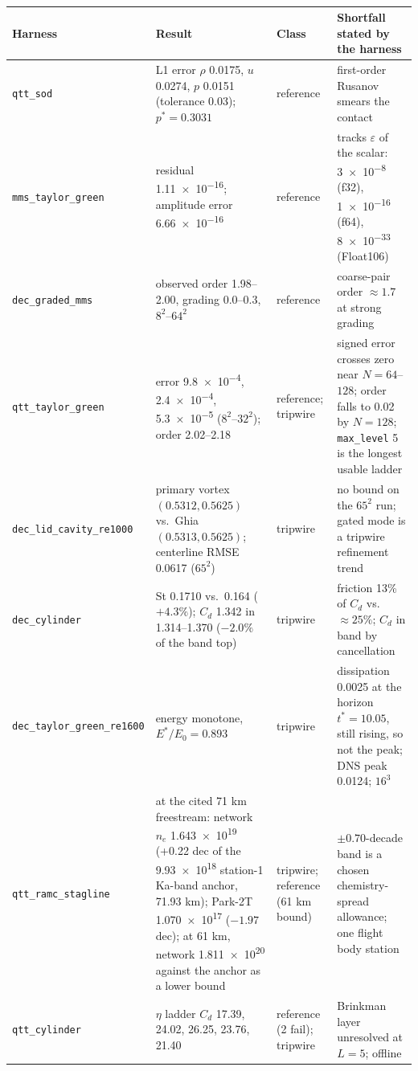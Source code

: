\begin{table}[t]
\centering
\caption{}
\label{tab:verification}
\footnotesize
\begin{tabularx}{\linewidth}{@{}l X l X@{}}
\toprule
Harness & Result & Class & Shortfall stated by the harness \\
\midrule
\texttt{qtt\_sod} & L1 error $\rho$ 0.0175, $u$ 0.0274, $p$ 0.0151 (tolerance 0.03); $p^\ast = 0.3031$ & reference & first-order Rusanov smears the contact \\
\texttt{mms\_taylor\_green} & residual \num{1.11e-16}; amplitude error \num{6.66e-16} & reference & tracks $\varepsilon$ of the scalar: \num{3e-8} (f32), \num{1e-16} (f64), \num{8e-33} (Float106) \\
\texttt{dec\_graded\_mms} & observed order 1.98--2.00, grading 0.0--0.3, $8^2$--$64^2$ & reference & coarse-pair order $\approx 1.7$ at strong grading \\
\texttt{qtt\_taylor\_green} & error \num{9.8e-4}, \num{2.4e-4}, \num{5.3e-5} ($8^2$--$32^2$); order 2.02--2.18 & reference; tripwire & signed error crosses zero near $N = 64$--$128$; order falls to 0.02 by $N = 128$; \texttt{max\_level} 5 is the longest usable ladder \\
\texttt{dec\_lid\_cavity\_re1000} & primary vortex $(0.5312, 0.5625)$ vs.\ Ghia $(0.5313, 0.5625)$; centerline RMSE 0.0617 ($65^2$) & tripwire & no bound on the $65^2$ run; gated mode is a tripwire refinement trend \\
\texttt{dec\_cylinder} & St 0.1710 vs.\ 0.164 ($+4.3\%$); $C_d$ 1.342 in 1.314--1.370 ($-2.0\%$ of the band top) & tripwire & friction 13\% of $C_d$ vs.\ $\approx 25\%$; $C_d$ in band by cancellation \\
\texttt{dec\_taylor\_green\_re1600} & energy monotone, $E^\ast/E_0 = 0.893$ & tripwire & dissipation 0.0025 at the horizon $t^\ast = 10.05$, still rising, so not the peak; DNS peak 0.0124; $16^3$ \\
\texttt{qtt\_ramc\_stagline} & at the cited 71 km freestream: network $n_e$ \num{1.643e19} (+0.22 dec of the \num{9.93e18} station-1 Ka-band anchor, 71.93 km); Park-2T \num{1.070e17} ($-1.97$ dec); at 61 km, network \num{1.811e20} against the anchor as a lower bound & tripwire; reference (61 km bound) & $\pm 0.70$-decade band is a chosen chemistry-spread allowance; one flight body station \\
\texttt{qtt\_cylinder} & $\eta$ ladder $C_d$ 17.39, 24.02, 26.25, 23.76, 21.40 & reference (2 fail); tripwire & Brinkman layer unresolved at $L = 5$; offline \\
\bottomrule
\end{tabularx}
\end{table}
